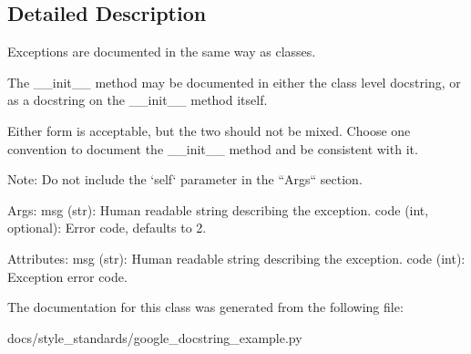 \subsection{Detailed Description}
\begin{DoxyVerb}Exceptions are documented in the same way as classes.

The __init__ method may be documented in either the class level
docstring, or as a docstring on the __init__ method itself.

Either form is acceptable, but the two should not be mixed. Choose one
convention to document the __init__ method and be consistent with it.

Note:
  Do not include the `self` parameter in the ``Args`` section.

Args:
  msg (str): Human readable string describing the exception.
  code (int, optional): Error code, defaults to 2.

Attributes:
  msg (str): Human readable string describing the exception.
  code (int): Exception error code.\end{DoxyVerb}
 

The documentation for this class was generated from the following file\-:\begin{DoxyCompactItemize}
\item 
docs/style\-\_\-standards/google\-\_\-docstring\-\_\-example.\-py\end{DoxyCompactItemize}
